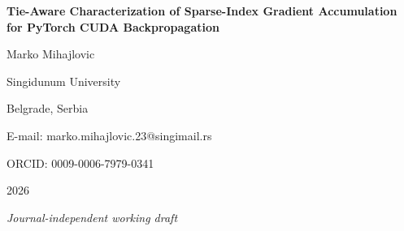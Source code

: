 \begin{titlepage}
    \centering
    \vspace*{1.5cm}
    {\LARGE\bfseries Tie-Aware Characterization of Sparse-Index Gradient Accumulation for PyTorch CUDA Backpropagation\par}
    \vspace{2cm}
    {\large Marko Mihajlovic\par}
    \vspace{0.5cm}
    {\large Singidunum University\par}
    \vspace{0.25cm}
    {\large Belgrade, Serbia\par}
    \vspace{0.25cm}
    {\large E-mail: marko.mihajlovic.23@singimail.rs\par}
    \vspace{0.25cm}
    {\large ORCID: 0009-0006-7979-0341\par}
    \vspace{0.5cm}
    {\large 2026\par}
    \vfill
    {\itshape Journal-independent working draft\par}
\end{titlepage}